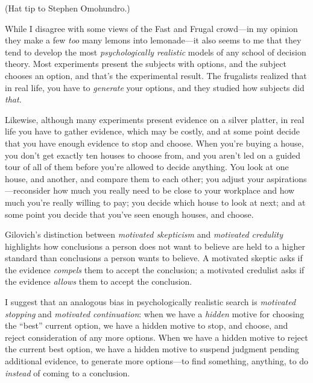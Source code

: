{
 (Hat tip to Stephen Omohundro.)}

\myendsectiontext


\bigskip


{
 While I disagree with some views of the Fast and Frugal crowd---in
my opinion they make a few \textit{too} many lemons into lemonade---it
also seems to me that they tend to develop the most
\textit{psychologically realistic} models of any school of decision
theory. Most experiments present the subjects with options, and the
subject chooses an option, and that's the experimental
result. The frugalists realized that in real life, you have to
\textit{generate} your options, and they studied how subjects did
\textit{that.} }

{
 Likewise, although many experiments present evidence on a silver
platter, in real life you have to gather evidence, which may be costly,
and at some point decide that you have enough evidence to stop and
choose. When you're buying a house, you
don't get exactly ten houses to choose from, and you
aren't led on a guided tour of all of them before
you're allowed to decide anything. You look at one
house, and another, and compare them to each other; you adjust your
aspirations---reconsider how much you really need to be close to your
workplace and how much you're really willing to pay;
you decide which house to look at next; and at some point you decide
that you've seen enough houses, and choose.}

{
 Gilovich's distinction between \textit{motivated
skepticism} and \textit{motivated credulity} highlights how conclusions
a person does not want to believe are held to a higher standard than
conclusions a person wants to believe. A motivated skeptic asks if the
evidence \textit{compels} them to accept the conclusion; a motivated
credulist asks if the evidence \textit{allows} them to accept the
conclusion.}

{
 I suggest that an analogous bias in psychologically realistic
search is \textit{motivated stopping} and \textit{motivated
continuation}: when we have a \textit{hidden} motive for choosing the
``best'' current option, we have a
hidden motive to stop, and choose, and reject consideration of any more
options. When we have a hidden motive to reject the current best
option, we have a hidden motive to suspend judgment pending additional
evidence, to generate more options---to find something, anything, to do
\textit{instead} of coming to a conclusion.}

